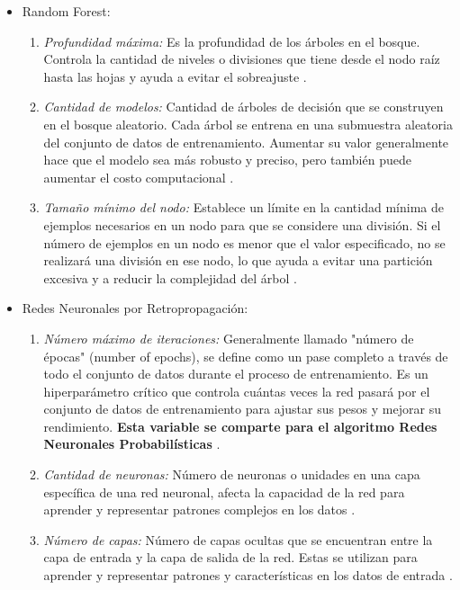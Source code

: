 \begin{itemize}
	\item Random Forest:
	\begin{enumerate}
		\item \textit{Profundidad máxima:} Es la profundidad de los árboles en el bosque. Controla la cantidad de niveles o divisiones que tiene desde el nodo raíz hasta las hojas y ayuda a evitar el sobreajuste \citep{scholkopf2018learning}.
		\item \textit{Cantidad de modelos:} Cantidad de árboles de decisión que se construyen en el bosque aleatorio. Cada árbol se entrena en una submuestra aleatoria del conjunto de datos de entrenamiento. Aumentar su valor generalmente hace que el modelo sea más robusto y preciso, pero también puede aumentar el costo computacional \citep{scholkopf2018learning}.
		\item \textit{Tamaño mínimo del nodo:} Establece un límite en la cantidad mínima de ejemplos necesarios en un nodo para que se considere una división. Si el número de ejemplos en un nodo es menor que el valor especificado, no se realizará una división en ese nodo, lo que ayuda a evitar una partición excesiva y a reducir la complejidad del árbol \citep{scholkopf2018learning}.
	\end{enumerate}
	\item Redes Neuronales por Retropropagación:
	\begin{enumerate}
		\item \textit{Número máximo de iteraciones: }Generalmente llamado "número de épocas" (number of epochs), se define como un pase completo a través de todo el conjunto de datos durante el proceso de entrenamiento. Es un hiperparámetro crítico que controla cuántas veces la red pasará por el conjunto de datos de entrenamiento para ajustar sus pesos y mejorar su rendimiento. \textbf{Esta variable se comparte para el algoritmo Redes Neuronales Probabilísticas} \citep{hastie2009elements}.
		\item \textit{Cantidad de neuronas:} Número de neuronas o unidades en una capa específica de una red neuronal, afecta la capacidad de la red para aprender y representar patrones complejos en los datos \citep{hastie2009elements}.
		\item \textit{Número de capas:} Número de capas ocultas que se encuentran entre la capa de entrada y la capa de salida de la red. Estas se utilizan para aprender y representar patrones y características en los datos de entrada \citep{hastie2009elements}.
	\end{enumerate}

\end{itemize}
